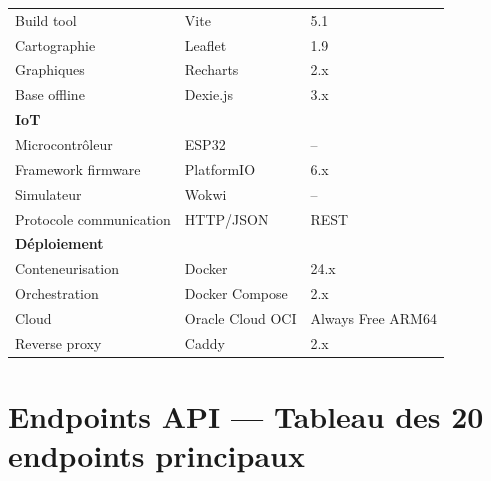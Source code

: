 \begin{table}[H]
\begin{tabular}{lll}
Build tool               & Vite              & 5.1 \\
Cartographie             & Leaflet           & 1.9 \\
Graphiques               & Recharts          & 2.x \\
Base offline             & Dexie.js          & 3.x \\
\midrule
\multicolumn{3}{l}{\textbf{IoT}} \\
Microcontrôleur          & ESP32             & -- \\
Framework firmware       & PlatformIO        & 6.x \\
Simulateur               & Wokwi             & -- \\
Protocole communication  & HTTP/JSON         & REST \\
\midrule
\multicolumn{3}{l}{\textbf{Déploiement}} \\
Conteneurisation         & Docker            & 24.x \\
Orchestration            & Docker Compose    & 2.x \\
Cloud                    & Oracle Cloud OCI  & Always Free ARM64 \\
Reverse proxy            & Caddy             & 2.x \\
\bottomrule
\end{tabular}
\end{table}

\section{Endpoints API — Tableau des 20 endpoints principaux}

